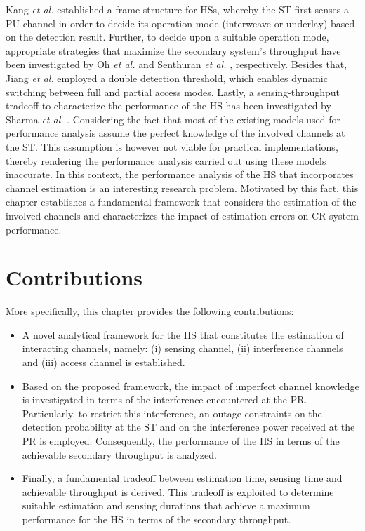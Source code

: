 Kang \textit{et al.} \cite{Kang09} established a frame structure for HSs, whereby the ST first senses a PU channel in order to decide its operation mode (interweave or underlay) based on the detection result. Further, to decide upon a suitable operation mode, appropriate strategies that maximize the secondary system's throughput have been investigated by Oh \textit{et al.} \cite{Oh10} and Senthuran \textit{et al.} \cite{Senthu12}, respectively. Besides that, Jiang \textit{et al.} employed a double detection threshold, which enables dynamic switching between full and partial access modes. Lastly, a sensing-throughput tradeoff to characterize the performance of the HS has been investigated by Sharma \textit{et al.} \cite{Sharma14}. 
Considering the fact that most of the existing models \cite{Kang09, Oh10, Senthu12, Jiang13, Sharma14} used for performance analysis assume the perfect knowledge of the involved channels at the ST. This assumption is however not viable for practical implementations, thereby rendering the performance analysis carried out using these models inaccurate. In this context, the performance analysis of the HS that incorporates channel estimation is an interesting research problem. Motivated by this fact, this chapter establishes a fundamental framework that considers the estimation of the involved channels and characterizes the impact of estimation errors on CR system performance.
\section{Contributions}
More specifically, this chapter provides the following contributions:
\begin{itemize}
\item 
A novel analytical framework for the HS that constitutes the estimation of interacting channels, namely: (i) sensing channel, (ii) interference channels and (iii) access channel is established.
\item
Based on the proposed framework, the impact of imperfect channel knowledge is investigated in terms of the interference encountered at the PR. Particularly, to restrict this interference, an outage constraints on the detection probability at the ST and on the interference power received at the PR is employed. Consequently, the performance of the HS in terms of the achievable secondary throughput is analyzed.
\item 
Finally, a fundamental tradeoff between estimation time, sensing time and achievable throughput is derived. This tradeoff is exploited to determine suitable estimation and sensing durations that achieve a maximum performance for the HS in terms of the secondary throughput. 
\end{itemize}

